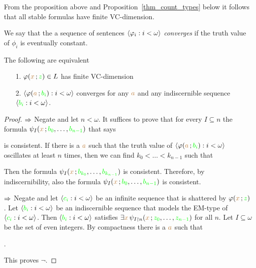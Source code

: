 From the proposition above and Proposition~\ref{thm_count_types} below it follows that all stable formulas have finite VC-dimension.

We say that the a sequence of sentences $\langle\varphi_i:i<\omega\rangle$ \emph{converges\/} if the truth value of $\phi_i$ is eventually constant.

\begin{lemma}\label{lem_altrank}
The following are equivalent
\begin{itemize}
\item[1.] $\varphi({\color{brown} x}\,;{\color{green} z})\in L$ has finite VC-dimension
\item[2.] $\langle\varphi({\color{brown} a}\,;{\color{green} b_i}):i<\omega\rangle$ converges for any ${\color{brown} a}$ and any indiscernible sequence $\langle{\color{green}b_i}:i<\omega\rangle$.
\end{itemize}
\end{lemma}

\begin{proof}
$\Rightarrow$ Negate  and let $n<\omega$. It suffices to prove that for every $I\subseteq n$ the formula $\psi_{I}({\color{brown} x}\,;{\color{green} b_0},\dots,{\color{green} b_{n-1}} )$ that says 


is consistent. If there is a ${\color{brown} a}$ such that the truth value of $\langle\varphi({\color{brown} a}\,;{\color{green} b_i}):i<\omega\rangle$ oscillates at least $n$ times, then we can find $k_0<\dots<k_{n-1}$ such that 


Then the formula $\psi_{I}({\color{brown} x}\,;{\color{green} b_{k_0}},\dots,{\color{green} b_{k_{n-1}}})$ is consistent.
Therefore, by indiscernibility, also the formula  $\psi_{I}({\color{brown} x}\,;{\color{green} b_0},\dots,{\color{green} b_{n-1}})$ is consistent.

$\Rightarrow$
Negate  and let  $\langle{\color{green}c_i}:i<\omega\rangle$ be an infinite sequence that is shattered by $\varphi({\color{brown} x}\,;{\color{green} z})$.
Let  $\langle{\color{green}b_i}:i<\omega\rangle$ be an indiscernible sequence that models the EM-type of $\langle{\color{green}c_i}:i<\omega\rangle$. Then $\langle{\color{green}b_i}:i<\omega\rangle$ satisfies $\exists{\color{brown}x}\,\psi_{I\restriction n}({\color{brown} x}\,;{\color{green} z_0},\dots,{\color{green} z_{n-1}})$ for all $n$. 
Let $I\subseteq\omega$ be the set of even integers.
By compactness there is a ${\color{brown} a}$ such that

.

This proves $\neg$.
\end{proof}

